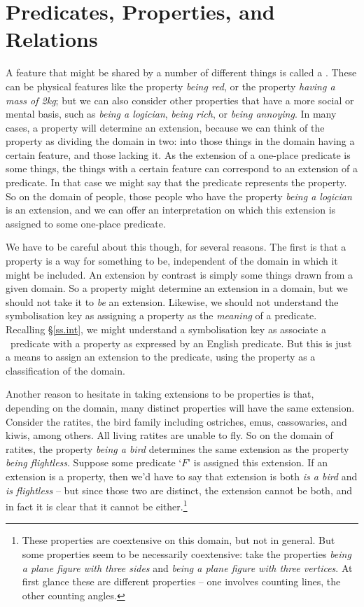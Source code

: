 \section{Predicates, Properties, and Relations}\label{predrel}

A feature that might be shared by a number of different things is called a . These can be physical features like the property \emph{being red}, or the property \emph{having a mass of 2kg}; but we can also consider other properties that have a more social or mental basis, such as \emph{being a logician}, \emph{being rich}, or \emph{being annoying}. In many cases, a property will determine an extension, because we can think of the property as dividing the domain in two: into those things in the domain having a certain feature, and those lacking it. As the extension of a one-place predicate is some things, the things with a certain feature can correspond to an extension of a predicate. In that case we might say that the predicate represents the property. So on the domain of people, those people who have the property \emph{being a logician} is an extension, and we can offer an interpretation on which this extension is assigned to some one-place predicate.

We have to be careful about this though, for several reasons. The first is that a property is a way for something to be, independent of the domain in which it might be included. An extension by contrast is simply some things drawn from a given domain. So a property might determine an extension in a domain, but we should not take it to \emph{be} an extension. Likewise, we should not understand the symbolisation key as assigning a property as the \emph{meaning} of a predicate. Recalling §\ref{ss.int}, we might understand a symbolisation key as associate a \FOL\ predicate with a property as expressed by an English predicate. But this is just a means to assign an extension to the predicate, using the property as a classification of the domain. 

Another reason to hesitate in taking extensions to be properties is that, depending on the domain, many distinct properties will have the same extension. Consider the ratites, the bird family including ostriches, emus, cassowaries, and kiwis, among others. All living ratites are unable to fly. So on the domain of ratites, the property \emph{being a bird} determines the same extension as the property \emph{being flightless}. Suppose some predicate `$F$' is assigned this extension. If an extension is a property, then we'd have to say that extension is both \emph{is a bird} and \emph{is flightless} – but since those two are distinct, the extension cannot be both, and in fact it is clear that it cannot be either.\footnote{These properties are coextensive on this domain, but not in general. But some properties seem to be necessarily coextensive: take the properties \emph{being a plane figure with three sides} and \emph{being a plane figure with three vertices}. At first glance these are different properties – one involves counting lines, the other counting angles.}

